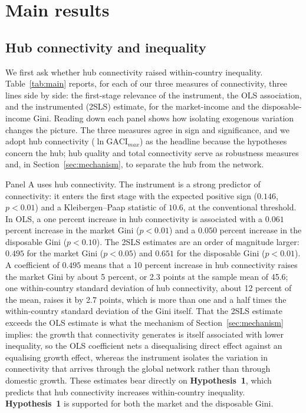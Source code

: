 \section{Main results}
\label{sec:results}
\subsection{Hub connectivity and inequality}
\label{sec:headline}
We first ask whether hub connectivity raised within-country inequality. Table~\ref{tab:main} reports, for each of our three measures of connectivity, three lines side by side: the first-stage relevance of the instrument, the OLS association, and the instrumented (2SLS) estimate, for the market-income and the disposable-income Gini. Reading down each panel shows how isolating exogenous variation changes the picture. The three measures agree in sign and significance, and we adopt hub connectivity ($\ln\mathrm{GACI}_{max}$) as the headline because the hypotheses concern the hub; hub quality and total connectivity serve as robustness measures and, in Section~\ref{sec:mechanism}, to separate the hub from the network.



Panel A uses hub connectivity. The instrument is a strong predictor of connectivity: it enters the first stage with the expected positive sign ($0.146$, $p<0.01$) and a Kleibergen--Paap statistic of $10.6$, at the conventional threshold. In OLS, a one percent increase in hub connectivity is associated with a $0.061$ percent increase in the market Gini ($p<0.01$) and a $0.050$ percent increase in the disposable Gini ($p<0.10$). The 2SLS estimates are an order of magnitude larger: $0.495$ for the market Gini ($p<0.05$) and $0.651$ for the disposable Gini ($p<0.01$). A coefficient of $0.495$ means that a 10 percent increase in hub connectivity raises the market Gini by about 5 percent, or 2.3 points at the sample mean of 45.6; one within-country standard deviation of hub connectivity, about 12 percent of the mean, raises it by 2.7 points, which is more than one and a half times the within-country standard deviation of the Gini itself. That the 2SLS estimate exceeds the OLS estimate is what the mechanism of Section~\ref{sec:mechanism} implies: the growth that connectivity generates is itself associated with lower inequality, so the OLS coefficient nets a disequalising direct effect against an equalising growth effect, whereas the instrument isolates the variation in connectivity that arrives through the global network rather than through domestic growth. These estimates bear directly on \textbf{Hypothesis~1}, which predicts that hub connectivity increases within-country inequality. \textbf{Hypothesis~1} is supported for both the market and the disposable Gini.

